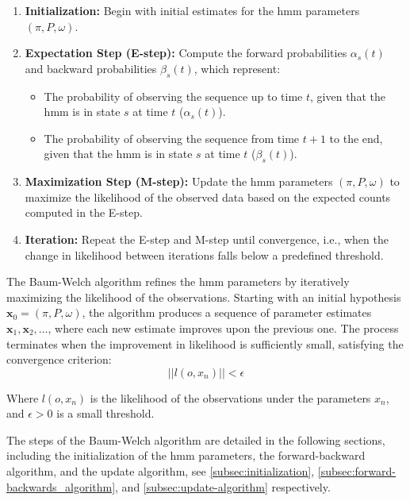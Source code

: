 \begin{enumerate}
    \item \textbf{Initialization:} Begin with initial estimates for the \gls{hmm} parameters $(\pi, P, \omega)$.
    \item \textbf{Expectation Step (E-step):}
    Compute the forward probabilities $\alpha_s(t)$ and backward probabilities $\beta_s(t)$, which represent:
        \begin{itemize}
            \item The probability of observing the sequence up to time $t$, given that the \gls{hmm} is in state $s$ at time $t$ ($\alpha_s(t)$).
            \item The probability of observing the sequence from time $t+1$ to the end, given that the \gls{hmm} is in state $s$ at time $t$ ($\beta_s(t)$).
        \end{itemize}

    \item \textbf{Maximization Step (M-step):} Update the \gls{hmm} parameters $(\pi, P, \omega)$ to maximize the likelihood of the observed data based on the expected counts computed in the E-step.
    \item \textbf{Iteration:} Repeat the E-step and M-step until convergence, i.e., when the change in likelihood between iterations falls below a predefined threshold.
    
\end{enumerate}
The Baum-Welch algorithm refines the \gls{hmm} parameters by iteratively maximizing the likelihood of the observations. 
Starting with an initial hypothesis $\textbf{x}_0 = (\pi, P, \omega)$, the algorithm produces a sequence of parameter estimates $\textbf{x}_1, \textbf{x}_2, \ldots$, where each new estimate improves upon the previous one. 
The process terminates when the improvement in likelihood is sufficiently small, satisfying the convergence criterion:
\[
||l(o,x_n)|| < \epsilon
\]

Where $l(o, x_n)$ is the likelihood of the observations under the parameters $x_n$, and $\epsilon > 0$ is a small threshold.

The steps of the Baum-Welch algorithm are detailed in the following sections, including the initialization of the \gls{hmm} parameters, the forward-backward algorithm, and the update algorithm, see \autoref{subsec:initialization}, \ref{subsec:forward-backwards_algorithm}, and \ref{subsec:update-algorithm} respectively.

